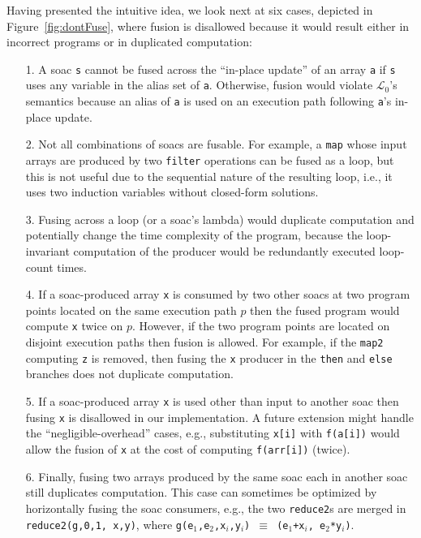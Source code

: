 \documentclass{sigplanconf}  %
\newcommand{\LO}{$\mathcal{L}_0$}
\begin{document}
Having presented the intuitive idea, we look next at six cases,
depicted in Figure~\ref{fig:dontFuse}, where fusion is disallowed because
it would result either in incorrect programs or in duplicated computation:
\begin{itemize}
    \item [1.] A {\sc soac} {\tt s} cannot be fused across the 
                ``in-place update'' of an array {\tt a} if {\tt s} uses any 
                variable in the alias set of {\tt a}.  Otherwise, fusion would
                violate \LO's semantics because an alias of {\tt a} is used on 
                an execution path following {\tt a}'s in-place update.
    \item [2.] Not all combinations of {\sc soac}s are fusable. For example,
                a {\tt map} whose input arrays are produced by two {\tt filter} 
                operations can be fused as a loop, but this is not useful
                due to the sequential nature of the resulting loop, i.e., it 
                uses two induction variables without closed-form solutions.
    \item [3.] Fusing across a loop (or a {\sc soac}'s lambda) would 
                duplicate computation and potentially change the  
                time complexity of the program, because the loop-invariant
                computation of the producer would be redundantly executed 
                loop-count times. 
    \item [4.] If a {\sc soac}-produced array {\tt x} is consumed by two other
                {\sc soac}s at two program points located on the same execution 
                path $p$ then the fused program would compute {\tt x} twice on $p$. 
                However, if the two program points are located on disjoint execution 
                paths then fusion is allowed. For example, if the {\tt map2} computing 
                {\tt z} is removed, then fusing the {\tt x} producer in the 
                {\tt then} and {\tt else} branches does not duplicate computation.
    \item [5.] If a {\sc soac}-produced array {\tt x} is used other than input to   
                another {\sc soac} then fusing {\tt x} is disallowed in our 
                implementation.   A future extension might handle the ``negligible-overhead'' 
                cases, e.g., substituting {\tt x[i]} with {\tt f(a[i])} 
                would allow the fusion of {\tt x} at the cost of computing {\tt f(arr[i])} (twice).
    \item [6.] Finally, fusing two arrays produced by the same {\sc soac} each in another
                {\sc soac} still duplicates computation. This case can sometimes
                be optimized by horizontally fusing the {\sc soac} consumers,
                e.g., the two {\tt reduce2}s are merged in {\tt reduce2(g,0,1, x,y)},
                where {\tt g(e$_1$,e$_2$,x$_i$,y$_i$)~$\equiv$~(e$_1$+x$_i$, e$_2$*y$_i$)}.
\end{itemize}
\end{document}
